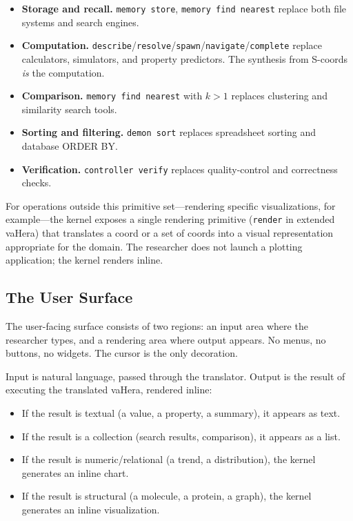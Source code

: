 \documentclass[11pt,twocolumn,a4paper]{article}
\begin{document}
\begin{itemize}[leftmargin=*]
\item \textbf{Storage and recall.} \texttt{memory store}, \texttt{memory find nearest} replace both file systems and search engines.
\item \textbf{Computation.} \texttt{describe}/\texttt{resolve}/\texttt{spawn}/\texttt{navigate}/\texttt{complete} replace calculators, simulators, and property predictors. The synthesis from S-coords \emph{is} the computation.
\item \textbf{Comparison.} \texttt{memory find nearest} with $k > 1$ replaces clustering and similarity search tools.
\item \textbf{Sorting and filtering.} \texttt{demon sort} replaces spreadsheet sorting and database ORDER BY.
\item \textbf{Verification.} \texttt{controller verify} replaces quality-control and correctness checks.
\end{itemize}

For operations outside this primitive set---rendering specific visualizations, for example---the kernel exposes a single rendering primitive (\texttt{render} in extended vaHera) that translates a coord or a set of coords into a visual representation appropriate for the domain. The researcher does not launch a plotting application; the kernel renders inline.

\subsection{The User Surface}

The user-facing surface consists of two regions: an input area where the researcher types, and a rendering area where output appears. No menus, no buttons, no widgets. The cursor is the only decoration.

Input is natural language, passed through the translator. Output is the result of executing the translated vaHera, rendered inline:

\begin{itemize}
\item If the result is textual (a value, a property, a summary), it appears as text.
\item If the result is a collection (search results, comparison), it appears as a list.
\item If the result is numeric/relational (a trend, a distribution), the kernel generates an inline chart.
\item If the result is structural (a molecule, a protein, a graph), the kernel generates an inline visualization.
\end{itemize}
\end{document}
